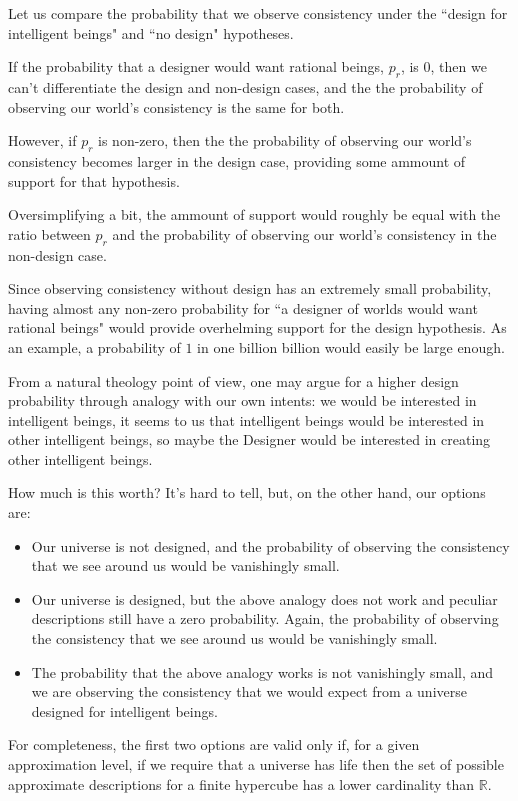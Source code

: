 \documentclass[a4paper
,draft
]{article}
\def\reale{\mathbb{R}}
\newcommand{\ghilimele}[1]{``#1"}
\begin{document}
Let us compare the probability that
we observe consistency under the \ghilimele{design for intelligent beings} and
\ghilimele{no design} hypotheses.

If the probability that a
designer would want rational beings, $p_r$, is $0$, then we can't
differentiate the design and non-design cases, and the
the probability of observing our world's consistency is the same
for both.

However, if $p_r$ is non-zero, then the
the probability of observing our world's consistency becomes larger in the
design case, providing some ammount of support for that hypothesis.

Oversimplifying a bit, the ammount of support would
roughly be equal with the ratio between $p_r$ and the probability of observing
our world's consistency in the non-design case.

Since observing consistency without design has an extremely
small probability,
having almost any non-zero probability for
\ghilimele{a designer of worlds would want
rational beings} would provide
overhelming support for the design hypothesis. As an example, a probability
of $1$ in one billion billion would easily be large enough.

From a natural theology point of view, one may argue for a higher design
probability through analogy with our own intents: we would be interested
in intelligent beings, it seems to us that intelligent beings would be
interested in other intelligent beings, so maybe the Designer would be
interested in creating other intelligent beings.

How much is this worth? It's hard to tell, but, on the other hand, our options
are:

\begin{itemize}
  \item Our universe is not designed,
        and the probability of observing the
        consistency that we see around us would be vanishingly small.
  \item Our universe is designed, but the above analogy does not work and
        peculiar descriptions still have a zero probability.
        Again, the probability of observing the
        consistency that we see around us would be vanishingly small.
  \item The probability that the above analogy works is not vanishingly small,
        and we are observing the consistency that we would expect from a
        universe designed for intelligent beings.
\end{itemize}
For completeness, the first two options are valid only if,
for a given approximation level, if we require that a universe has life then
the set of possible approximate descriptions for a finite hypercube
has a lower cardinality than $\reale$.
\end{document}
